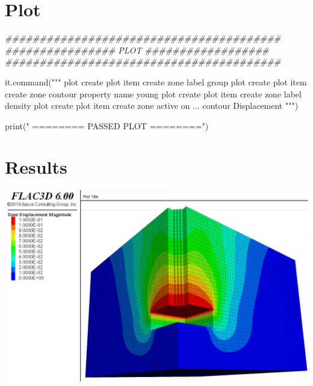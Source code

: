 \documentclass[a4paper, nobind]{templates/ociamthesis}
\newenvironment{Shaded}{\begin{snugshade}}{\end{snugshade}}
\newcommand{\BuiltInTok}[1]{#1}
\newcommand{\CommentTok}[1]{\textcolor[rgb]{0.56,0.35,0.01}{\textit{#1}}}
\newcommand{\NormalTok}[1]{#1}
\newcommand{\StringTok}[1]{\textcolor[rgb]{0.31,0.60,0.02}{#1}}
\renewenvironment{Shaded}
{
  \vspace{10pt}%
  \begin{snugshade}%
}{%
  \end{snugshade}%
  \vspace{8pt}%
}
\begin{document}
\hypertarget{plot}{%
\section{Plot}\label{plot}}

\begin{Shaded}
\begin{Highlighting}[]
\CommentTok{\#\#\#\#\#\#\#\#\#\#\#\#\#\#\#\#\#\#\#\#\#\#\#\#\#\#\#\#\#\#\#\#\#\#\#\#\#\#\#\#}
\CommentTok{\#\#\#\#\#\#\#\#\#\#\#\#\#\#\#\# PLOT \#\#\#\#\#\#\#\#\#\#\#\#\#\#\#\#\#\#}
\CommentTok{\#\#\#\#\#\#\#\#\#\#\#\#\#\#\#\#\#\#\#\#\#\#\#\#\#\#\#\#\#\#\#\#\#\#\#\#\#\#\#\#}

\NormalTok{it.command(}\StringTok{"""}
\StringTok{plot create}
\StringTok{plot item create zone label group}
\StringTok{plot create}
\StringTok{plot item create zone contour property name \textquotesingle{}young\textquotesingle{}}
\StringTok{plot create}
\StringTok{plot item create zone label density}
\StringTok{plot create}
\StringTok{plot item create zone active on ...}
\StringTok{    contour Displacement}
\StringTok{"""}\NormalTok{)}

\BuiltInTok{print}\NormalTok{(}\StringTok{"               ======== PASSED PLOT ========"}\NormalTok{)}
\end{Highlighting}
\end{Shaded}

\hypertarget{results}{%
\section{Results}\label{results}}

\includegraphics[width=1\linewidth]{myfigureeeeee/result}
\end{document}
